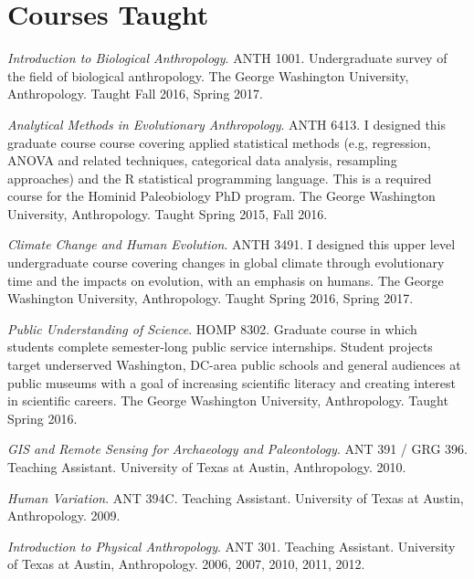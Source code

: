 \documentclass{article}
\newenvironment{mylist}
{\begin{description}[style=unboxed,leftmargin=1.3cm]}
{\end{description}}
\begin{document}
\section*{Courses Taught}
\begin{mylist}

\item[]\emph{Introduction to Biological Anthropology}. ANTH 1001. Undergraduate survey of the field of biological anthropology. The George Washington University, Anthropology. Taught Fall 2016, Spring 2017.

\item[] \emph{Analytical Methods in Evolutionary Anthropology}. ANTH 6413. I designed this graduate course course covering applied statistical methods (e.g, regression, ANOVA and related techniques, categorical data analysis, resampling approaches) and the R statistical programming language. This is a required course for the Hominid Paleobiology PhD program. The George Washington University, Anthropology. Taught Spring 2015, Fall 2016.

\item[] \emph{Climate Change and Human Evolution}. ANTH 3491. I designed this upper level undergraduate course covering changes in global climate through evolutionary time and the impacts on evolution, with an emphasis on humans. The George Washington University, Anthropology. Taught Spring 2016, Spring 2017.

\item[] \emph{Public Understanding of Science}. HOMP 8302.  Graduate course in which students complete semester-long public service internships. Student projects target underserved Washington, DC-area public schools and general audiences at public museums with a goal of increasing scientific literacy and creating interest in scientific careers. The George Washington University, Anthropology. Taught Spring 2016.

\item[] \emph{GIS and Remote Sensing for Archaeology and Paleontology}. ANT 391 / GRG 396. Teaching Assistant.  University of Texas at Austin, Anthropology. 2010.

\item[] \emph{Human Variation}. ANT 394C. Teaching Assistant. University of Texas at Austin, Anthropology. 2009.

\item[] \emph{Introduction to Physical Anthropology}. ANT 301. Teaching Assistant. University of Texas at Austin, Anthropology. 2006, 2007, 2010, 2011, 2012.
\end{mylist}
\end{document}
